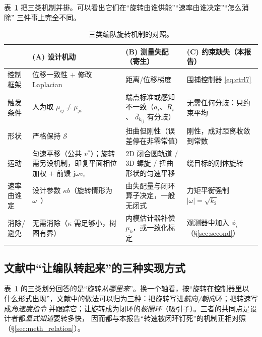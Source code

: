\documentclass[11pt,a4paper]{ctexart}
\theoremstyle{plain}
\theoremstyle{definition}
\theoremstyle{remark}
\newcommand{\abs}[1]{\left|#1\right|}
\begin{document}
表~\ref{tab:methods} 把三类机制并排。可以看出它们在“旋转由谁供能”“速率由谁决定”“怎么消除”
三件事上完全不同。

\begin{table}[htbp]
\centering
\small
\caption{三类编队旋转机制的对照。}
\label{tab:methods}
\setlength{\tabcolsep}{4pt}
\renewcommand{\arraystretch}{1.15}
\begin{tabular}{>{\raggedright\arraybackslash}p{}
                >{\raggedright\arraybackslash}p{}
                >{\raggedright\arraybackslash}p{}
                >{\raggedright\arraybackslash}p{}}
\toprule
 & \textbf{(A) 设计机动} & \textbf{(B) 测量失配（寄生）} & \textbf{(C) 约束缺失（本报告）}\\
\midrule
控制框架 & 位移一致性 $+$ 修改 Laplacian & 距离/位移梯度 & 围捕控制器 \eqref{eq:ctrl7}\\
触发条件 & 人为取 $\mu_{ij}\neq\mu_{ji}$ & 端点标准或感知不一致（$a_i$、$R_i$、
            $\bar d_{k_{ij}}$ 有分歧） & 无需任何分歧：只约束平均\\
形状 & 严格保持 $\mathcal S$ & 扭曲但刚性（误差停在非零常值） & 刚性，成对距离收敛到常数\\
运动 & 匀速平移（公共 $v^*$）；旋转需另设机制，即复平面相位加权
           $+$ 前馈 $\mathrm j\omega v_i$~\cite{lin2010} & 2D 闭合圆轨道 / 3D 螺旋 / 扭曲形状的匀速平移 &
           绕目标的刚体旋转\\
速率由谁定 & 设计参数 $\kappa b$（旋转情形为 $\omega$~\cite{lin2010}） & 由失配量与闭环算子决定，一般无闭式 &
           力矩平衡强制 $\abs{\omega}=\sqrt{k_2}$\\
消除/避免 & 无需消除（$\kappa$ 需足够小，树图有界） & 内模估计器补偿 $\mu_k$，或一致化标定 &
           观测器中加入 $\phi_i$（\S\ref{sec:second}）\\
\bottomrule
\end{tabular}
\end{table}

\subsection{文献中“让编队转起来”的三种实现方式}
\label{sec:meth_impl}

表~\ref{tab:methods} 的三类划分回答的是“旋转\emph{从哪里来}”。换一个轴看，按“旋转在控制器里以
什么形式出现”，文献中的做法可以归为三种：把旋转写进\emph{航向/朝向}环；把转速写成\emph{角速度指令}
并跟踪它；让旋转成为闭环的\emph{极限环}（吸引子）。三者的共同点是设计者都\emph{显式知道}要转多快，
因而都与本报告“转速被闭环钉死”的机制正相对照（\S\ref{sec:meth_relation}）。
\end{document}
